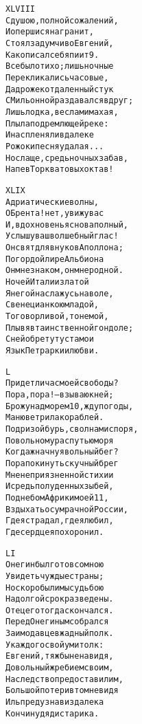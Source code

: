 \begin{minipage}[t]{\dimexpr 0.5\textwidth -\tabcolsep-.5pt}
\begin{alltt}\normalfont\centering
XLVIII
С душою, полной сожалений,
И опершися на гранит,
Стоял задумчиво Евгений,
Как описал себя пиит 9.
Все было тихо; лишь ночные
Перекликались часовые,
Да дрожек отдаленный стук
С Мильонной раздавался вдруг;
Лишь лодка, веслами махая,
Плыла по дремлющей реке:
И нас пленяли вдалеке
Рожок и песня удалая...
Но слаще, средь ночных забав,
Напев Торкватовых октав!
\end{alltt}
\end{minipage}
\clearpage

\begin{minipage}[t]{\dimexpr 0.5\textwidth -\tabcolsep-.5pt}
\begin{alltt}\normalfont\centering
XLIX
Адриатические волны,
О Брента! нет, увижу вас
И, вдохновенья снова полный,
Услышу ваш волшебный глас!
Он свят для внуков Аполлона;
По гордой лире Альбиона
Он мне знаком, он мне родной.
Ночей Италии златой
Я негой наслажусь на воле,
С венецианкою младой,
То говорливой, то немой,
Плывя в таинственной гондоле;
С ней обретут уста мои
Язык Петрарки и любви.
\end{alltt}
\end{minipage}

\begin{minipage}[t]{\dimexpr 0.5\textwidth -\tabcolsep-.5pt}
\begin{alltt}\normalfont\centering
L
Придет ли час моей свободы?
Пора, пора! — взываю к ней;
Брожу над морем 10, жду погоды,
Маню ветрила кораблей.
Под ризой бурь, с волнами споря,
По вольному распутью моря
Когда ж начну я вольный бег?
Пора покинуть скучный брег
Мне неприязненной стихии
И средь полуденных зыбей,
Под небом Африки моей 11,
Вздыхать о сумрачной России,
Где я страдал, где я любил,
Где сердце я похоронил.
\end{alltt}
\end{minipage}
\clearpage

\begin{minipage}[t]{\dimexpr 0.5\textwidth -\tabcolsep-.5pt}
\begin{alltt}\normalfont\centering
LI
Онегин был готов со мною
Увидеть чуждые страны;
Но скоро были мы судьбою
На долгой срок разведены.
Отец его тогда скончался.
Перед Онегиным собрался
Заимодавцев жадный полк.
У каждого свой ум и толк:
Евгений, тяжбы ненавидя,
Довольный жребием своим,
Наследство предоставил им,
Большой потери в том не видя
Иль предузнав издалека
Кончину дяди старика.
\end{alltt}
\end{minipage}

